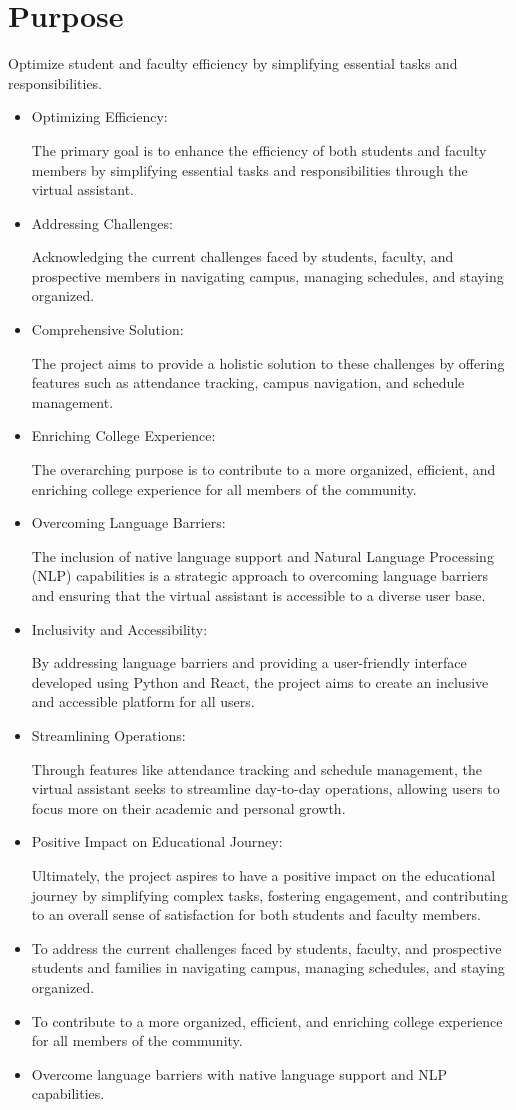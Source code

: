 \documentclass[12pt,a4paper]{report}
\begin{document}
\section{Purpose}
Optimize student and faculty efficiency by simplifying essential tasks and responsibilities.
\begin{itemize}
    \item Optimizing Efficiency:

The primary goal is to enhance the efficiency of both students and faculty members by simplifying essential tasks and responsibilities through the virtual assistant.
\item Addressing Challenges:

Acknowledging the current challenges faced by students, faculty, and prospective members in navigating campus, managing schedules, and staying organized.
\item Comprehensive Solution:

The project aims to provide a holistic solution to these challenges by offering features such as attendance tracking, campus navigation, and schedule management.
\item Enriching College Experience:

The overarching purpose is to contribute to a more organized, efficient, and enriching college experience for all members of the community.
\item Overcoming Language Barriers:

The inclusion of native language support and Natural Language Processing (NLP) capabilities is a strategic approach to overcoming language barriers and ensuring that the virtual assistant is accessible to a diverse user base.
\item Inclusivity and Accessibility:

By addressing language barriers and providing a user-friendly interface developed using Python and React, the project aims to create an inclusive and accessible platform for all users.
\item Streamlining Operations:

Through features like attendance tracking and schedule management, the virtual assistant seeks to streamline day-to-day operations, allowing users to focus more on their academic and personal growth.
\item Positive Impact on Educational Journey:

Ultimately, the project aspires to have a positive impact on the educational journey by simplifying complex tasks, fostering engagement, and contributing to an overall sense of satisfaction for both students and faculty members.


	\item To address the current challenges faced by students, faculty, and prospective students and families in navigating campus, managing schedules, and staying organized.
    \item To contribute to a more organized, efficient, and enriching college experience for all members of the community.
    \item Overcome language barriers with native language support and NLP capabilities.
\end{itemize}
\end{document}
